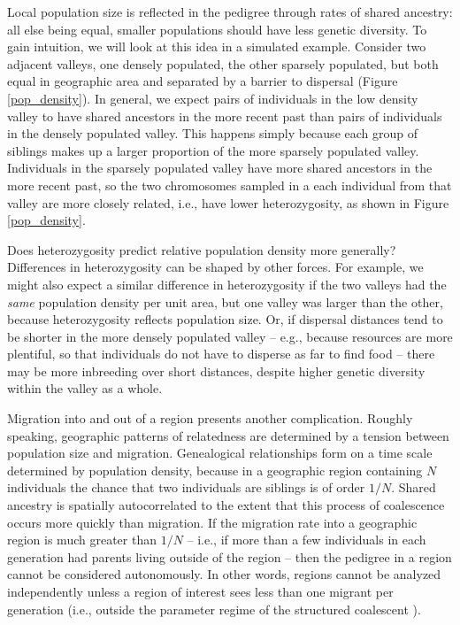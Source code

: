 \documentclass{ar-1col}
\renewcommand{\emph}[1]{{\textit{#1}}}
\begin{document}
Local population size is reflected in the pedigree through rates of shared ancestry:
all else being equal, smaller populations should have less genetic diversity.
To gain intuition, we will look at this idea in a simulated example.
Consider two adjacent valleys, 
one densely populated, the other sparsely populated, 
but both equal in geographic area 
and separated by a barrier to dispersal (Figure \ref{pop_density}).
In general, we expect pairs of individuals in the low density valley 
to have shared ancestors in the more recent past than 
pairs of individuals in the densely populated valley.
This happens simply because 
each group of siblings makes up a larger proportion 
of the more sparsely populated valley.
Individuals in the sparsely populated valley 
have more shared ancestors in the more recent past, 
so the two chromosomes sampled in a each individual 
from that valley are more closely related,
i.e., have lower heterozygosity, as shown in Figure \ref{pop_density}.

Does heterozygosity predict relative population density more generally?
Differences in heterozygosity can be shaped by other forces.
For example, we might also expect a similar difference in heterozygosity
if the two valleys had the \emph{same} population density per unit area,
but one valley was larger than the other,
because heterozygosity reflects population size.
Or, if dispersal distances tend to be shorter
in the more densely populated valley -- 
e.g., because resources are more plentiful, 
so that individuals do not have to disperse as far to find food -- 
there may be more inbreeding over short distances,
despite higher genetic diversity within the valley as a whole.

Migration into and out of a region presents another complication.
Roughly speaking,
geographic patterns of relatedness
are determined by a tension between population size and migration.
Genealogical relationships form on a time scale determined by population density,
because in a geographic region containing $N$ individuals
the chance that two individuals are siblings is of order $1/N$.
Shared ancestry is spatially autocorrelated
to the extent that this process of coalescence
occurs more quickly than migration.
If the migration rate into a geographic region is much greater than $1/N$ --
i.e., if more than a few individuals in each generation had parents living outside of the region --
then the pedigree in a region cannot be considered autonomously.
In other words,
regions cannot be analyzed independently
unless a region of interest sees less than one migrant per generation
(i.e., outside the parameter regime of the structured coalescent \citep{nagylaki1998}).
\end{document}
